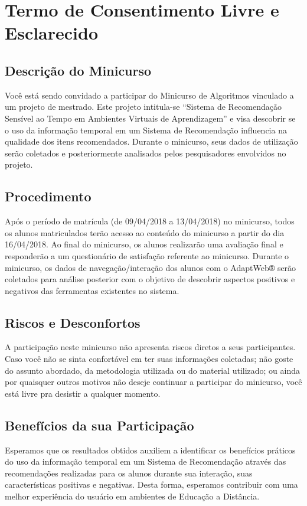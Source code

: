 \chapter{Termo de Consentimento Livre e Esclarecido}\label{ape:termo-de-consentimento}

\section{Descrição do Minicurso}

Você está sendo convidado a participar do Minicurso de Algoritmos vinculado a um projeto de mestrado. Este projeto intitula-se “Sistema de Recomendação Sensível ao Tempo em Ambientes Virtuais de Aprendizagem” e visa descobrir se o uso da informação temporal em um Sistema de Recomendação influencia na qualidade dos itens recomendados.
Durante o minicurso, seus dados de utilização serão coletados e posteriormente analisados pelos pesquisadores envolvidos no projeto.

\section{Procedimento}
Após o período de matrícula (de 09/04/2018 a 13/04/2018) no minicurso, todos os alunos matriculados terão acesso ao conteúdo do minicurso a partir do dia 16/04/2018. Ao final do minicurso, os alunos realizarão uma avaliação final e responderão a um questionário de satisfação referente ao minicurso.
Durante o minicurso, os dados de navegação/interação dos alunos com o AdaptWeb® serão coletados para análise posterior com o objetivo de descobrir aspectos positivos e negativos das ferramentas existentes no sistema.

\section{Riscos e Desconfortos}
A participação neste minicurso não apresenta riscos diretos a seus participantes. Caso você não se sinta confortável em ter suas informações coletadas; não goste do assunto abordado, da metodologia utilizada ou do material utilizado; ou ainda por quaisquer outros motivos não deseje continuar a participar do minicurso, você está livre pra desistir a qualquer momento.

\section{Benefícios da sua Participação}
Esperamos que os resultados obtidos auxiliem a identificar os benefícios práticos do uso da informação temporal em um Sistema de Recomendação através das recomendações realizadas para os alunos durante sua interação, suas características positivas e negativas. Desta forma, esperamos contribuir com uma melhor experiência do usuário em ambientes de Educação a Distância.


